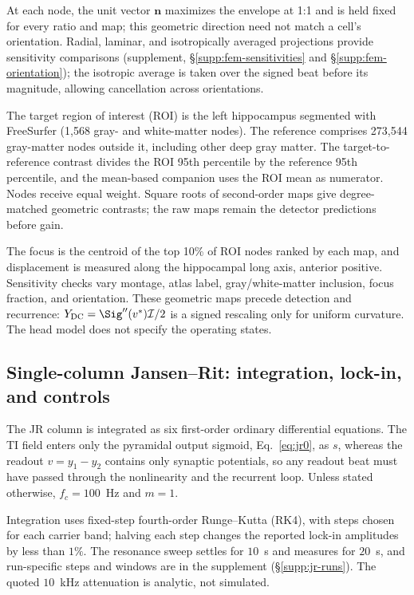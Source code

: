 At each node, the unit vector $\mathbf n$ maximizes the envelope at 1:1 and is held
fixed for every ratio and map; this geometric direction need not match a cell's
orientation. Radial, laminar, and isotropically averaged projections provide
sensitivity comparisons (supplement, \S\ref{supp:fem-sensitivities} and
\S\ref{supp:fem-orientation}); the isotropic average is taken over the signed beat before its
magnitude, allowing cancellation across orientations.

The target region of interest (ROI) is the left hippocampus segmented with FreeSurfer
(1,568 gray- and white-matter nodes). The reference comprises 273,544 gray-matter nodes
outside it, including other deep gray matter. The
target-to-reference contrast divides the ROI 95th percentile by the reference 95th
percentile, and the mean-based companion uses the ROI mean as numerator.
Nodes receive equal weight. Square roots of
second-order maps give degree-matched geometric contrasts; the raw maps remain the
detector predictions before gain.

The focus is the centroid of the top 10\% of ROI nodes ranked by each map, and
displacement is measured along the hippocampal long axis, anterior positive.
Sensitivity checks vary montage, atlas label, gray/white-matter inclusion, focus
fraction, and orientation. These geometric maps precede detection and recurrence:
$Y_{\rm DC}=\Sig''(v^*)\mathcal I/2$ is a signed rescaling only for uniform
curvature. The head model does not specify the operating states.

\else
\label{supp:fem-protocol}

\fi

\subsection{Single-column Jansen--Rit: integration, lock-in, and controls}\label{sec:jr-methods}
The JR column is integrated as six first-order ordinary differential equations. The TI
field enters only the pyramidal output sigmoid, Eq.~\eqref{eq:jr0}, as $s$, whereas
the readout $v=y_1-y_2$ contains only synaptic potentials, so any readout beat must
have passed through the nonlinearity and the recurrent loop. Unless stated otherwise,
$f_c=100$~Hz and $m=1$.

Integration uses fixed-step fourth-order Runge--Kutta (RK4), with steps chosen for each
carrier band; halving each step changes the reported lock-in amplitudes by less than
$1\%$. The resonance sweep settles for $10$~s and measures for $20$~s, and run-specific
steps and windows are in the supplement (\S\ref{supp:jr-runs}). The quoted $10$~kHz
attenuation is analytic, not simulated.
\ifjne\else

\fi

